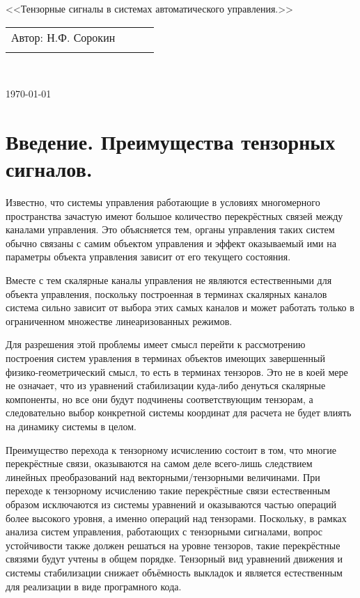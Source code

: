 \documentclass[a4paper]{article}
\begin{document}
\begin{center}
\hfill \break
\hfill\break
\hfill \break
\hfill \break
\hfill \break
\hfill \break
\hfill \break
\hfill \break
\hfill \break
\hfill \break
\large{<<Тензорные сигналы в системах автоматического управления.>>}\\
\hfill \break
\hfill \break
\hfill \break
\hfill \break
\hfill \break
\hfill \break
\hfill \break
\hfill \break
\end{center}
 
\normalsize{ 
\begin{tabular}{lccl}
Автор: Н.Ф. Сорокин\\\\
\end{tabular}
}\\
\hfill \break
\hfill \break
\hfill \break
\hfill \break
\hfill \break
\begin{center} \today \end{center}
\thispagestyle{empty} %
\newpage

\section{Введение. Преимущества тензорных сигналов.}

Известно, что системы управления работающие в условиях многомерного пространства зачастую имеют большое количество перекрёстных связей между каналами управления. Это объясняется тем, органы управления таких систем обычно связаны с самим объектом управления и эффект оказываемый ими на параметры объекта управления зависит от его текущего состояния.

Вместе с тем скалярные каналы управления не являются естественными для объекта управления, поскольку построенная в терминах скалярных каналов система сильно зависит от выбора этих самых каналов и может работать только в ограниченном множестве линеаризованных режимов.

Для разрешения этой проблемы имеет смысл перейти к рассмотрению построения систем уравления в терминах объектов имеющих завершенный физико-геометрический смысл, то есть в терминах тензоров. Это не в коей мере не означает, что из уравнений стабилизации куда-либо денуться скалярные компоненты, но все они будут подчинены соответствующим тензорам, а следовательно выбор конкретной системы координат для расчета не будет влиять на динамику системы в целом. 

Преимущество перехода к тензорному исчислению состоит в том, что многие перекрёстные связи, оказываются на самом деле всего-лишь следствием линейных преобразований над векторными/тензорными величинами. При переходе к тензорному исчислению такие перекрёстные связи естественным образом исключаются из системы уравнений и оказываются частью операций более высокого уровня, а именно операций над тензорами. Поскольку, в рамках анализа систем управления, работающих с тензорными сигналами, вопрос устойчивости также должен решаться на уровне тензоров, такие перекрёстные связями будут учтены в общем порядке. Тензорный вид уравнений движения и системы стабилизации снижает объёмность выкладок и является естественным для реализации в виде програмного кода. 
\end{document}
